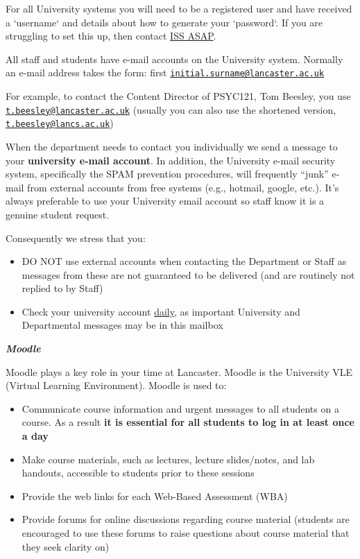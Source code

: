 \documentclass[
]{book}
\begin{document}
For all University systems you will need to be a registered user and have received a `username` and details about how to generate your `password`. If you are struggling to set this up, then contact \href{https://www.lancaster.ac.uk/iss/help-and-support/}{ISS ASAP}.

All staff and students have e-mail accounts on the University system. Normally an e-mail address takes the form: first \href{mailto:initial.surname@lancaster.ac.uk}{\nolinkurl{initial.surname@lancaster.ac.uk}}

For example, to contact the Content Director of PSYC121, Tom Beesley, you use \href{mailto:t.beesley@lancaster.ac.uk}{\nolinkurl{t.beesley@lancaster.ac.uk}} (usually you can also use the shortened version, \href{mailto:t.beesley@lancs.ac.uk}{\nolinkurl{t.beesley@lancs.ac.uk}})

When the department needs to contact you individually we send a message to your \textbf{university e-mail account}. In addition, the University e-mail security system, specifically the SPAM prevention procedures, will frequently ``junk'' e-mail from external accounts from free systems (e.g., hotmail, google, etc.). It's always preferable to use your University email account so staff know it is a genuine student request.

Consequently we stress that you:

\begin{itemize}
\item
  DO NOT use external accounts when contacting the Department or Staff as messages from these are not guaranteed to be delivered (and are routinely not replied to by Staff)
\item
  Check your university account \underline{daily}, as important University and Departmental messages may be in this mailbox
\end{itemize}

\textbf{\emph{Moodle}}

Moodle plays a key role in your time at Lancaster. Moodle is the University VLE (Virtual Learning Environment). Moodle is used to:

\begin{itemize}
\item
  Communicate course information and urgent messages to all students on a course. As a result \textbf{it is essential for all students to log in at least once a day}
\item
  Make course materials, such as lectures, lecture slides/notes, and lab handouts, accessible to students prior to these sessions
\item
  Provide the web links for each Web-Based Assessment (WBA)
\item
  Provide forums for online discussions regarding course material (students are encouraged to use these forums to raise questions about course material that they seek clarity on)
\end{itemize}
\end{document}
